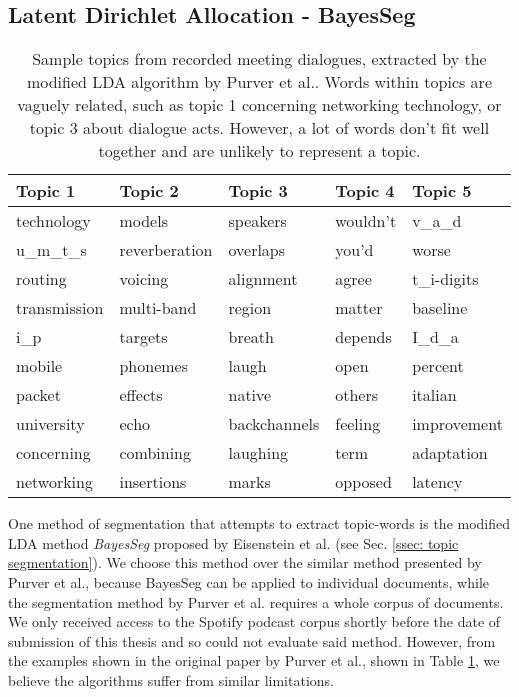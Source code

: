 \subsection{Latent Dirichlet Allocation - BayesSeg} 
    \begin{table}[]
    \centering
    \begin{tabular}{lllll}
    \hline
    \textbf{Topic 1}   & \textbf{Topic 2}    & \textbf{Topic 3}   & \textbf{Topic 4} & \textbf{Topic 5}  \\ \hline
    technology   & models        & speakers     & wouldn't   & v\_a\_d     \\
    u\_m\_t\_s   & reverberation & overlaps     & you'd      & worse       \\
    routing      & voicing       & alignment    & agree      & t\_i-digits \\
    transmission & multi-band    & region       & matter     & baseline    \\
    i\_p         & targets       & breath       & depends    & I\_d\_a     \\
    mobile       & phonemes      & laugh        & open       & percent     \\
    packet       & effects       & native       & others     & italian     \\
    university   & echo          & backchannels & feeling    & improvement \\
    concerning   & combining     & laughing     & term       & adaptation  \\
    networking   & insertions    & marks        & opposed    & latency     \\ \hline
    \end{tabular}
    \caption{Sample topics from recorded meeting dialogues, extracted by the modified LDA algorithm by Purver et al.\cite{purver2006unsupervised}. Words within topics are vaguely related, such as topic 1 concerning networking technology, or topic 3 about dialogue acts. However, a lot of words don't fit well together and are unlikely to represent a topic.}
    \label{table: modified lda topics}
    \end{table}
    
    One method of segmentation that attempts to extract topic-words is the modified LDA method \textit{BayesSeg} proposed by Eisenstein et al.\cite{eisenstein2008bayesian} (see Sec. \ref{ssec: topic segmentation}). We choose this method over the similar method presented by Purver et al.\cite{purver2006unsupervised}, because BayesSeg can be applied to individual documents, while the segmentation method by Purver et al. requires a whole corpus of documents. We only received access to the Spotify podcast corpus shortly before the date of submission of this thesis and so could not evaluate said method. However, from the examples shown in the original paper by Purver et al.\cite{purver2006unsupervised}, shown in Table \ref{table: modified lda topics}, we believe the algorithms suffer from similar limitations.
    
